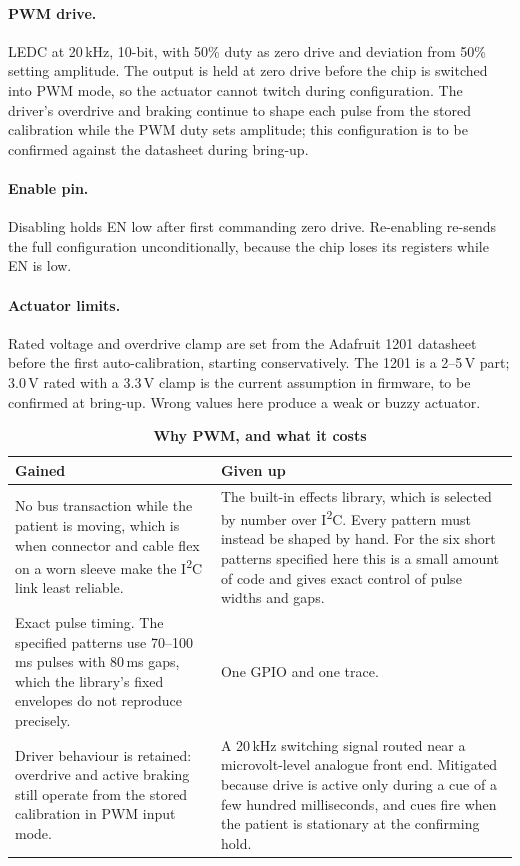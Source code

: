 \documentclass[11pt]{article}
\begin{document}
\paragraph{PWM drive.} LEDC at 20\,kHz, 10-bit, with 50\% duty as zero drive and
deviation from 50\% setting amplitude. The output is held at zero drive before
the chip is switched into PWM mode, so the actuator cannot twitch during
configuration. The driver's overdrive and braking continue to shape each pulse
from the stored calibration while the PWM duty sets amplitude; this
configuration is to be confirmed against the datasheet during bring-up.

\paragraph{Enable pin.} Disabling holds EN low after first commanding zero
drive. Re-enabling re-sends the full configuration unconditionally, because the
chip loses its registers while EN is low.

\paragraph{Actuator limits.} Rated voltage and overdrive clamp are set from the
Adafruit 1201 datasheet before the first auto-calibration, starting
conservatively. The 1201 is a 2--5\,V part; 3.0\,V rated with a 3.3\,V clamp is
the current assumption in firmware, to be confirmed at bring-up. Wrong values
here produce a weak or buzzy actuator.

\begin{table}[H]
\centering\small
\caption*{\textbf{Why PWM, and what it costs}}
\begin{tabularx}{\linewidth}{@{}p{62mm} X@{}}
\toprule
\textbf{Gained} & \textbf{Given up} \\
\midrule
No bus transaction while the patient is moving, which is when connector and
cable flex on a worn sleeve make the I\textsuperscript{2}C link least reliable. &
The built-in effects library, which is selected by number over
I\textsuperscript{2}C. Every pattern must instead be shaped by hand. For the six
short patterns specified here this is a small amount of code and gives exact
control of pulse widths and gaps. \\[3pt]
Exact pulse timing. The specified patterns use 70--100\,ms pulses with 80\,ms
gaps, which the library's fixed envelopes do not reproduce precisely. &
One GPIO and one trace. \\[3pt]
Driver behaviour is retained: overdrive and active braking still operate from
the stored calibration in PWM input mode. &
A 20\,kHz switching signal routed near a microvolt-level analogue front end.
Mitigated because drive is active only during a cue of a few hundred
milliseconds, and cues fire when the patient is stationary at the confirming
hold. \\
\bottomrule
\end{tabularx}
\end{table}
\end{document}
